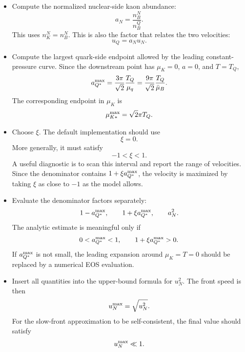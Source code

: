 \documentclass[11pt]{article}
\begin{document}
\begin{itemize}
\begin{equation}
\end{equation}
The code should convert this time to the same unit system used in the
diffusion coefficient and velocity formula, then set
\begin{equation}
\gamma=\frac{1}{\tau}.
\end{equation}
\item Compute the normalized nuclear-side kaon abundance:
\begin{equation}
a_N=\frac{n_B^N}{n_B^Q}.
\end{equation}
This uses \(n_K^N=n_B^N\). This is also the factor that relates the two
velocities:
\begin{equation}
u_Q=a_Nu_N.
\end{equation}
\item Compute the largest quark-side endpoint allowed by the leading
constant-pressure curve. Since the downstream point has \(\mu_K=0\), \(a=0\),
and \(T=T_Q\),
\begin{equation}
a_{Q^*}^{\rm max}
=
\frac{3\pi}{\sqrt{2}}\frac{T_Q}{\mu_q}
=
\frac{9\pi}{\sqrt{2}}\frac{T_Q}{\bar\mu_B}.
\end{equation}
The corresponding endpoint in \(\mu_K\) is
\begin{equation}
\mu_{K*}^{\rm max}
=
\sqrt{2}\pi T_Q .
\end{equation}
\item Choose \(\xi\). The default implementation should use
\begin{equation}
\xi=0.
\end{equation}
More generally, it must satisfy
\begin{equation}
-1<\xi<1.
\end{equation}
A useful diagnostic is to scan this interval and report the range of velocities.
Since the denominator contains \(1+\xi a_{Q^*}^{\rm max}\), the velocity is
maximized by taking \(\xi\) as close to \(-1\) as the model allows.
\item Evaluate the denominator factors separately:
\begin{equation}
1-a_{Q^*}^{\rm max},
\qquad
1+\xi a_{Q^*}^{\rm max},
\qquad
a_N^2.
\end{equation}
The analytic estimate is meaningful only if
\begin{equation}
0<a_{Q^*}^{\rm max}<1,
\qquad
1+\xi a_{Q^*}^{\rm max}>0.
\end{equation}
If \(a_{Q^*}^{\rm max}\) is not small, the leading expansion around
\(\mu_K=T=0\) should be replaced by a numerical EOS evaluation.
\item Insert all quantities into the upper-bound formula for \(u_N^2\). The
front speed is then
\begin{equation}
u_N^{\rm max}=\sqrt{u_N^2}.
\end{equation}
For the slow-front approximation to be self-consistent, the final value should
satisfy
\begin{equation}
u_N^{\rm max}\ll1.
\end{equation}
\end{itemize}
\end{document}
